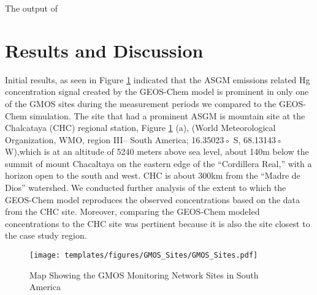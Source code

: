 \begin{flushleft}
The output of 
\end{flushleft}

\section{Results and Discussion}
\begin{flushleft}


Initial results, as seen in Figure \ref{fig:GMOSvsGC} indicated that the ASGM emissions related Hg concentration signal created by the GEOS-Chem model is prominent in only one of the GMOS sites during the measurement periods we compared to the GEOS-Chem simulation. The site that had a prominent ASGM  is mountain site at the Chalcataya (CHC) regional station, Figure \ref{fig:GMOSvsGC} (a), (World Meteorological Organization, WMO, region III-- South America; 16.35023◦ S, 68.13143◦ W),which is at an altitude of 5240 meters above sea level, about 140m below the summit of mount Chacaltaya on the eastern edge of the ``Cordillera Real,'' with a horizon open to the south and west. CHC is about 300km from the ``Madre de Dios'' watershed. We conducted further analysis of the extent to which the GEOS-Chem model reproduces the observed concentrations based on the data from the CHC site. Moreover, comparing the GEOS-Chem modeled concentrations to the CHC site was pertinent because it is also the site closest to the case study region. 
\end{flushleft}
\begin{figure}[H]





\texttt{[image: templates/figures/GMOS\_Sites/GMOS\_Sites.pdf]}
  \caption{Map Showing the GMOS Monitoring Network Sites in South America}
  \label{fig:GMOS_stations}
  
\centering
{}
\label{fig:GMOSvsGC}
\end{figure}
\FloatBarrier
